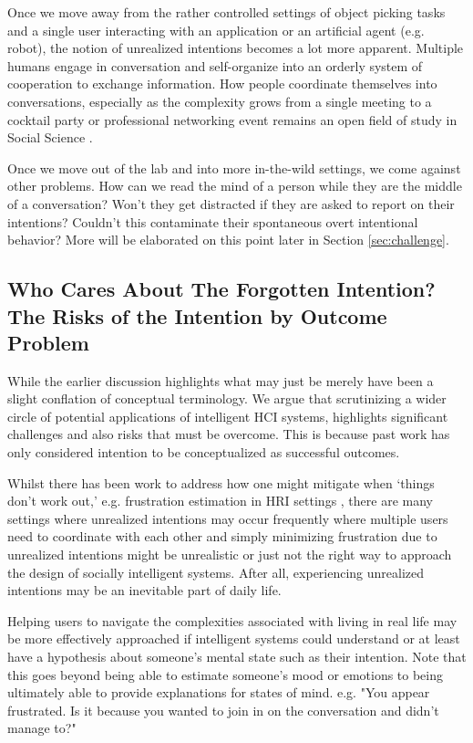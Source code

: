 \documentclass[sigconf]{acmart}
\begin{document}
Once we move away from the rather controlled settings of object picking tasks and a single user interacting with an application or an artificial agent (e.g. robot), the notion of unrealized intentions becomes a lot more apparent. Multiple humans engage in conversation and self-organize into an orderly system of cooperation to exchange information. How people coordinate themselves into conversations, especially as the complexity grows from a single meeting to a cocktail party or professional networking event remains an open field of study in Social Science \cite{KendonInteraction1990,dioszegietal2020b}. 

Once we move out of the lab and into more in-the-wild settings, we come against other problems. How can we read the mind of a person while they are the middle of a conversation? Won't they get distracted if they are asked to report on their intentions? Couldn't this contaminate their spontaneous overt intentional behavior? More will be elaborated on this point later in Section \ref{sec:challenge}.

\subsection{Who Cares About The Forgotten Intention? The Risks of the Intention by Outcome Problem}
While the earlier discussion highlights what may just be merely have been a slight conflation of conceptual terminology. We argue that scrutinizing a wider circle of potential applications of intelligent HCI systems, highlights significant challenges and also risks that must be overcome. This is because past work has only considered intention to be conceptualized as successful outcomes. 

Whilst there has been work to address how one might mitigate when `things don't work out,' e.g. frustration estimation in HRI settings \cite{10.3389/fpsyg.2021.640186}, there are many settings where unrealized intentions may occur frequently where multiple users need to coordinate with each other and simply minimizing frustration due to unrealized intentions might be unrealistic or just not the right way to approach the design of socially intelligent systems. After all, experiencing unrealized intentions may be an inevitable part of daily life. 

Helping users to navigate the complexities associated with living in real life may be more effectively approached if intelligent systems could understand or at least have a hypothesis about someone's mental state such as their intention. Note that this goes beyond being able to estimate someone's mood or emotions to being ultimately able to provide explanations for states of mind. e.g. "You appear frustrated. Is it because you wanted to join in on the conversation and didn't manage to?"
\end{document}
